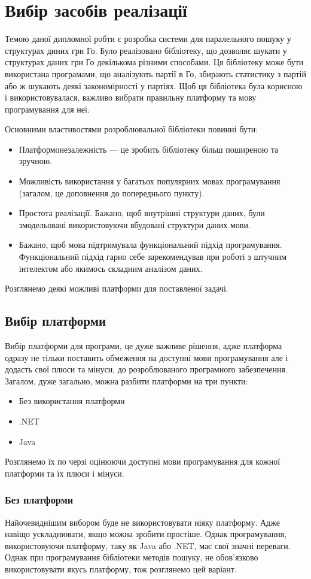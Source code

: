 \chapter{Вибір засобів реалізації}
Темою даної дипломної робти є розробка системи для паралельного пошуку у структурах диних гри Го. Було реалізовано бібліотеку, що дозволяє шукати у структурах даних гри Го декількома різними способами. Ця бібліотеку може бути використана програмами, що аналізують партії в Го, збирають статистику з партій або ж шукають деякі закономірності у партіях. Щоб ця бібліотека була корисною і використовувалася, важливо вибрати правильну платформу та мову програмування для неї.

Основними властивостями розроблювальної бібліотеки повинні бути:
\begin{itemize}
	\item Платформонезалежність --- це зробить бібліотеку більш поширеною та зручною.
	\item Можливість використання у багатьох популярних мовах програмування (загалом, це доповнення до попереднього пункту).
	\item Простота реалізації. Бажано, щоб внутрішні структури даних, були змодельовані використовуючи вбудовані структури даних мови.
	\item Бажано, щоб мова підтримувала функціональний підхід програмування. Функціональний підхід гарно себе зарекомендував при роботі з штучним інтелектом або якимось складним аналізом даних.
\end{itemize}

Розглянемо деякі можливі платформи для поставленої задачі.
\section{Вибір платформи}
Вибір платформи для програми, це дуже важливе рішення, адже платформа одразу не тільки поставить обмеження на доступні мови програмування але і додасть свої плюси та мінуси, до розроблюваного програмного забезпечення. Загалом, дуже загально, можна разбити платформи на три пункти:
\begin{itemize}
	\item Без використання платформи
	\item .NET
	\item Java
\end{itemize}

Розглянемо їх по черзі оцінюючи доступні мови програмування для кожної платформи та їх плюси і мінуси.
\subsection{Без платформи}
Найочевиднішим вибором буде не використовувати ніяку платформу. Адже навіщо ускладнювати, якщо можна зробити простіше. Однак програмування, використовуючи платформу, таку як Java або .NET, має свої значні переваги. Однак при програмування бібліотеки методів пошуку, не обов'язково використовувати якусь платформу, тож розглянемо цей варіант.

